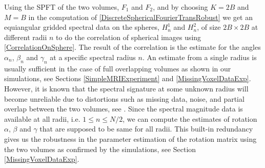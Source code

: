 \documentclass{UCF_ETD}
\begin{document}
Using the SPFT of the two volumes, $F_1$ and $F_2$, and by choosing $K = 2B$ and $M = B$ in the computation of \eqref{DiscreteSphericalFourierTransRobust} we get an equiangular gridded spectral data on the spheres, $H^1_n$ and $H^2_n$, of size $2B \times 2B$ at different radii $n$ to do the correlation of spherical images using \eqref{CorrelationOnSphere}. The result of the correlation is the estimate for the angles $\alpha_n$, $\beta_n$ and $\gamma_n$ at a specific spectral radius $n$. An estimate from a single radius is usually sufficient in the case of full overlapping volumes as shown in our simulations, see Sections \ref{SimpleMRIExperiment} and \ref{MissingVoxelDataExp}. However, it is known that the spectral signature at some unknown radius will become unreliable due to distortions such as missing data, noise, and partial overlap between the two volumes, see \cite{Bulow2013}. Since the spectral magnitude data is available at all radii, i.e. $1\leq n \leq N/2$, we can compute the estimates of rotation $\alpha$, $\beta$ and $\gamma$ that are supposed to be same for all radii. This built-in redundancy gives us the robustness in the parameter estimation of the rotation matrix using the two volumes as confirmed by the simulations, see Section \ref{MissingVoxelDataExp}.
\end{document}
